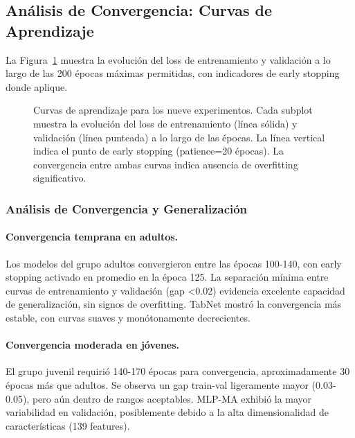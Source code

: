 \documentclass[12pt,a4paper]{article}
\begin{document}

\subsection{Análisis de Convergencia: Curvas de Aprendizaje}

La Figura~\ref{fig:learning_curves} muestra la evolución del loss de entrenamiento y validación a lo largo de las 200 épocas máximas permitidas, con indicadores de early stopping donde aplique.

\begin{figure}[H]
\centering
{}
\caption{Curvas de aprendizaje para los nueve experimentos. Cada subplot muestra la evolución del loss de entrenamiento (línea sólida) y validación (línea punteada) a lo largo de las épocas. La línea vertical indica el punto de early stopping (patience=20 épocas). La convergencia entre ambas curvas indica ausencia de overfitting significativo.}
\label{fig:learning_curves}
\end{figure}

\subsubsection{Análisis de Convergencia y Generalización}

\paragraph{Convergencia temprana en adultos.} Los modelos del grupo adultos convergieron entre las épocas 100-140, con early stopping activado en promedio en la época 125. La separación mínima entre curvas de entrenamiento y validación (gap <0.02) evidencia excelente capacidad de generalización, sin signos de overfitting. TabNet mostró la convergencia más estable, con curvas suaves y monótonamente decrecientes.

\paragraph{Convergencia moderada en jóvenes.} El grupo juvenil requirió 140-170 épocas para convergencia, aproximadamente 30 épocas más que adultos. Se observa un gap train-val ligeramente mayor (0.03-0.05), pero aún dentro de rangos aceptables. MLP-MA exhibió la mayor variabilidad en validación, posiblemente debido a la alta dimensionalidad de características (139 features).
\end{document}
